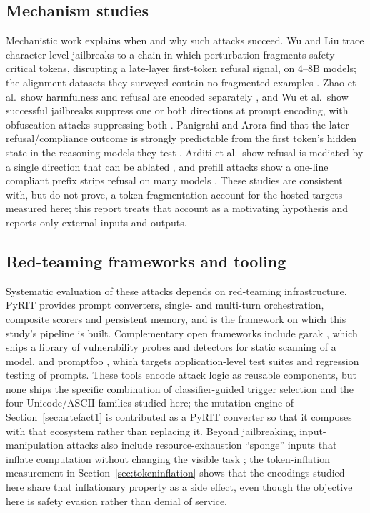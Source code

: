 \documentclass[a4paper,12pt]{article}
\begin{document}
\subsection{Mechanism studies}

Mechanistic work explains when and why such attacks succeed. Wu and Liu trace
character-level jailbreaks to a chain in which perturbation fragments
safety-critical tokens, disrupting a late-layer first-token refusal signal, on 4--8B
models; the alignment datasets they surveyed contain no fragmented examples
\cite{wu2026tokenboundary}. Zhao et al.\ show harmfulness and refusal are encoded
separately \cite{zhao2025harmfulness}, and Wu et al.\ show successful jailbreaks
suppress one or both directions at prompt encoding, with obfuscation attacks
suppressing both \cite{wu2026harc}. Panigrahi and Arora find that the later
refusal/compliance outcome is strongly predictable from the first token's hidden state
in the reasoning models they test \cite{panigrahi2026thinking}. Arditi et al.\ show refusal
is mediated by a single direction that can be ablated \cite{arditi2024refusal}, and
prefill attacks show a one-line compliant prefix strips refusal on many models
\cite{liu2026prefill}. These studies are consistent with, but do not prove, a
token-fragmentation account for the hosted targets measured here; this report treats
that account as a motivating hypothesis and reports only external inputs and outputs.

\subsection{Red-teaming frameworks and tooling}

Systematic evaluation of these attacks depends on red-teaming infrastructure. PyRIT
\cite{munoz2024pyrit} provides prompt converters, single- and multi-turn
orchestration, composite scorers and persistent memory, and is the framework on which
this study's pipeline is built. Complementary open frameworks include garak
\cite{derczynski2024garak}, which ships a library of vulnerability probes and detectors
for static scanning of a model, and promptfoo \cite{promptfoo2026}, which targets
application-level test suites and regression testing of prompts. These tools encode
attack logic as reusable components, but none ships the specific combination of
classifier-guided trigger selection and the four Unicode/ASCII families studied here;
the mutation engine of Section~\ref{sec:artefact1} is contributed as a PyRIT converter
so that it composes with that ecosystem rather than replacing it. Beyond jailbreaking,
input-manipulation attacks also include resource-exhaustion ``sponge'' inputs that
inflate computation without changing the visible task \cite{shumailov2021sponge}; the
token-inflation measurement in Section~\ref{sec:tokeninflation} shows that the
encodings studied here share that inflationary property as a side effect, even though
the objective here is safety evasion rather than denial of service.
\end{document}
